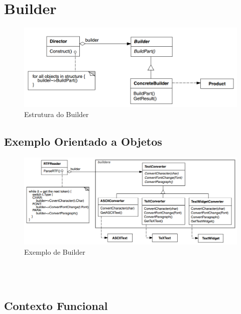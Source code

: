 \section{Builder}

\begin{figure}[htb]
	\caption{\label{builder_struct}Estrutura do Builder}
	\begin{center}
	    \includegraphics[scale=0.4]{5_padroes-contexto-funcional/5.1_criacionais/5.1.3_builder/diagram.png}
	\end{center}
\end{figure}

\subsection*{Exemplo Orientado a Objetos}



\begin{figure}[htb]
	\caption{\label{builder_exemplo}Exemplo de Builder}
	\begin{center}
	    \includegraphics[scale=0.4]{5_padroes-contexto-funcional/5.1_criacionais/5.1.3_builder/exemplo_builder.png}
	\end{center}
\end{figure}

\begin{lstlisting}[caption={Builder Orientado a Objetos},label=oobuilder]



\end{lstlisting}

\subsection*{Contexto Funcional}


\begin{lstlisting}[caption={Builder Funcional},label=fpbuilder]
    

    
\end{lstlisting}